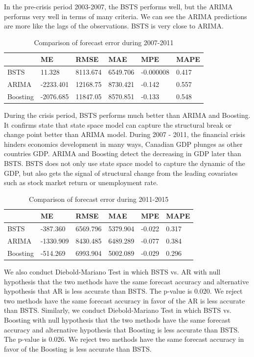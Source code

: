 In the pre-crisis period 2003-2007, the BSTS performs well, but the ARIMA performs very well in terms of many criteria. We can see the ARIMA predictions are more like the lags of the observations. BSTS is very close to ARIMA.  


\begin{table}[h]
	\centering
	\begin{tabular}{@{}llllll@{}}
		\toprule
		& ME          & RMSE      & MAE       & MPE       & MAPE     \\ \midrule
		BSTS          & 11.328 & 8113.674 & 6549.706 & -0.000008 & 0.417 \\
		ARIMA         & -2233.401 & 12168.75 & 8730.421 & -0.142 & 0.557  \\ 
		Boosting      & -2076.685 & 11847.05 & 8570.851 & -0.133 & 0.548\\ \bottomrule
	\end{tabular}
	\caption{Comparison of forecast error during 2007-2011}
	\label{ErrorCom2}
\end{table}

During the crisis period, BSTS performs much better than ARIMA and Boosting. It confirms  state that state space model can capture the structural break or change point better than ARIMA model. During 2007 - 2011, the financial crisis hinders economics development in many ways, Canadian GDP plunges as other countries GDP. ARIMA and Boosting detect the decreasing in GDP later than BSTS. BSTS does not only use state space model to capture the dynamic of the GDP, but also gets the signal of structural change from the leading covariates such as stock market return or unemployment rate.  

\begin{table}[h]
	\centering
	\begin{tabular}{@{}llllll@{}}
		\toprule
		& ME          & RMSE      & MAE       & MPE       & MAPE     \\ \midrule
		BSTS          & -387.360 & 6569.796 & 5379.904 & -0.022 & 0.317 \\
		ARIMA         & -1330.909 & 8430.485 & 6489.289 & -0.077 & 0.384 \\ 
		Boosting      & -514.269 & 6993.904 & 5002.089 & -0.029 & 0.296\\ \bottomrule
	\end{tabular}
	\caption{Comparison of forecast error during 2011-2015}
	\label{ErrorCom3}
\end{table}


We also conduct Diebold-Mariano Test in which BSTS vs. AR with null hypothesis that the two methods have the same forecast accuracy and alternative hypothesis that AR is less accurate than BSTS. The p-value is 0.020. We reject two methods have the same forecast accuracy in favor of the AR is less accurate than BSTS. Similarly, we conduct Diebold-Mariano Test in which BSTS vs. Boosting with null hypothesis that the two methods have the same forecast accuracy and alternative hypothesis that Boosting is less accurate than BSTS. The p-value is 0.026. We reject two methods have the same forecast accuracy in favor of the Boosting is less accurate than BSTS.	




